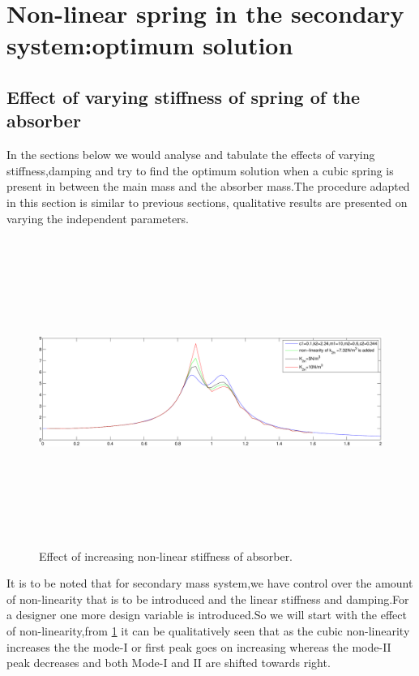 \section{Non-linear spring in the secondary system:optimum solution}
\subsection{Effect of varying stiffness of spring of the absorber }
In the sections below we would analyse and tabulate the effects of varying stiffness,damping and try to find the optimum solution when a cubic spring is present in between the main mass and the absorber mass.The procedure adapted in this section is similar to previous sections, qualitative results are presented on varying the independent parameters.
\begin{figure}[h!]
\includegraphics[width=16cm,height=10cm]{"figures/nonlinearity_secondary_1"}
  \caption{Effect of increasing non-linear stiffness of absorber.}
  \label{fig:non-linear secondary 1}
  \end{figure}

It is to be noted that for secondary mass system,we have control over the amount of non-linearity that is to be introduced and the linear stiffness and damping.For a designer one more design variable is introduced.So we will start with the effect of non-linearity,from \ref{fig:non-linear secondary 1} it can be qualitatively seen that as the cubic non-linearity increases the the mode-I or first peak goes on increasing whereas the mode-II peak decreases and both Mode-I and II are shifted towards right.\\


